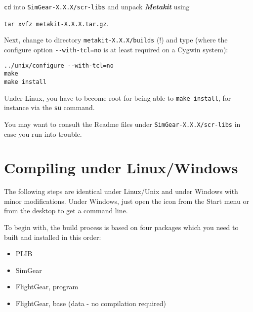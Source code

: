 \noindent
 \texttt{cd} into \texttt{SimGear-X.X.X/scr-libs} and unpack \textbf{\textit{Metakit}} using
 \medskip
 
 \noindent
 				\texttt{tar xvfz metakit-X.X.X.tar.gz}.
 	\medskip
 	
 \noindent			
 Next, change to directory \texttt{metakit-X.X.X/builds} (!) and type (where the configure option \texttt{-$ $-with-tcl=no} is at least required on a Cygwin system):
 \medskip

 \noindent
        \texttt{../unix/configure -$ $-with-tcl=no}\\
        \texttt{make}\\
        \texttt{make install}
  \medskip

 \noindent
 Under Linux, you have to become root for being able to \texttt{make install}, for instance via the \texttt{su} command. 
 
  You may want to consult the Readme files under \texttt{SimGear-X.X.X/scr-libs} in case you run into trouble.

\section{Compiling \FlightGear{} under Linux/Windows\label{compilinglinwin} }

The following steps are identical under Linux/Unix and under Windows with minor
modifications. Under Windows, just open the \Cygwin{} icon from the Start menu or from
the desktop to get a command line.

To begin with, the \FlightGear{} build process is based on four packages which you need to built and installed in this order:

\begin{itemize}
\item PLIB
\item SimGear
\item FlightGear, program
\item FlightGear, base (data - no compilation required)
\end{itemize}


